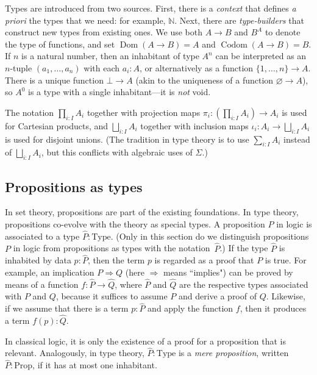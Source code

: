 \documentclass{amsart}
\newcommand{\tin}{:}
\numberwithin{lstfloat}{section}
\DeclareMathOperator{\Dom}{Dom}
\DeclareMathOperator{\Codom}{Codom}
\newcommand{\type}[1]{#1}
\newcommand{\pf}{p}
\theoremstyle{definition}
\theoremstyle{remark}
\numberwithin{equation}{section}
\begin{document}
Types are introduced from two sources.  
First, there is a \emph{context} that defines
\textit{a priori} the types that we need: for example, $\mathbb{N}$.  
Next, there are \emph{type-builders} that construct new types from
existing ones. We use both $\type{A}\to \type{B}$ and $\type{B}^{\type{A}}$ to
denote the type of functions, and set $\Dom (A\to B) = A$ and 
$\Codom (A\to B) = B$. If $n$ is a natural number, then an inhabitant of
type $\type{A}^n$ can be interpreted as an
$n$-tuple $(a_1,\ldots,a_n)$ with each $a_i: \type{A}$, or alternatively 
as a function $\{1,\ldots,n\}\to
\type{A}$.  There is a unique function $\bot\to A$ (akin to the uniqueness of a function $\varnothing \to A$), so $A^0$ is a type with a single
inhabitant---it is \emph{not} void.

The notation $\prod_{i\tin I}\type{A}_i$ together with projection maps $\pi_i:
\left(\prod_{i\tin I}\type{A}_i\right) \to A_i$ is used for Cartesian products,
and $\bigsqcup_{i\tin I} \type{A}_i$ together with inclusion maps $\iota_i : A_i
\to \bigsqcup_{i\tin I} \type{A}_i$ is used for disjoint unions. (The tradition
in type theory is to use $\sum_{i\tin I}\type{A}_i$ instead of $\bigsqcup_{i\tin
I} \type{A}_i$, but this conflicts with algebraic uses of $\Sigma$.) 


\subsection{Propositions as types}\label{sec-propositions-as-types}
In set theory, propositions are part of the existing foundations. 
In type theory, propositions co-evolve with the theory as special types. A
proposition $P$ in logic is associated to a type $\hat{P}:\mathrm{Type}$. 
(Only in this section do we distinguish propositions $P$ in logic from 
propositions as types with the notation~$\hat{P}$.) 
If the type $\hat{P}$ is
inhabited by data $\pf:\hat{P}$, then the term $\pf$ is regarded as a proof that
$P$ is true. For example, an implication $P \Rightarrow Q$ (here
$\Rightarrow$ means ``implies") can be proved by means of a function
$f:\hat{P}\to \hat{Q}$, where $\hat{P}$ and $\hat{Q}$ are the respective types
associated with $P$ and $Q$, because it suffices to assume $P$ and derive a
proof of $Q$.  Likewise, if we assume that there is a 
term $\pf:\hat{P}$ and apply the
function $f$, then it produces a term $f(\pf):\hat{Q}$. 

In classical logic, it is only the existence of a proof for a proposition that
is relevant. Analogously, in type theory,
$\hat{P}:\mathrm{Type}$ is a \emph{mere proposition}, 
written $\hat{P}:\mathrm{Prop}$, if it has at most one inhabitant.  
\end{document}
